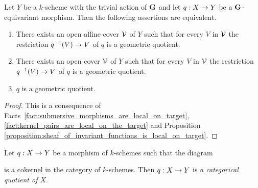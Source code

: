 \begin{corollary}\label{corollary:geometric_quotients_are_local_on_the_target}
Let $Y$ be a $k$-scheme with the trivial action of $\mathbf{G}$ and let $q:X\rightarrow Y$ be a $\mathbf{G}$-equivariant morphism. Then the following assertions are equivalent.
\begin{enumerate}[label=\emph{\textbf{(\roman*)}}, leftmargin=3.0em]
\item There exists an open affine cover ${\mathcal V}$ of $Y$ such that for every $V$ in ${\mathcal V}$ the restriction $q^{-1}(V)\rightarrow V$ of $q$ is a geometric quotient.
\item There exists an open cover ${\mathcal V}$ of $Y$ such that for every $V$ in ${\mathcal V}$ the restriction $q^{-1}(V)\rightarrow V$ of $q$ is a geometric quotient.
\item $q$ is a geometric quotient.
\end{enumerate}
\end{corollary}
\begin{proof}
This is a consequence of Facts \ref{fact:submersive_morphisms_are_local_on_target}, \ref{fact:kernel_pairs_are_local_on_the_target} and Proposition \ref{proposition:sheaf_of_invariant_functions_is_local_on_target}.
\end{proof}

\begin{definition}
Let $q:X\rightarrow Y$ be a morphism of $k$-schemes such that the diagram
\begin{center}
\end{center}
is a cokernel in the category of $k$-schemes. Then $q:X\rightarrow Y$ is \textit{a categorical quotient of $X$}.
\end{definition}

